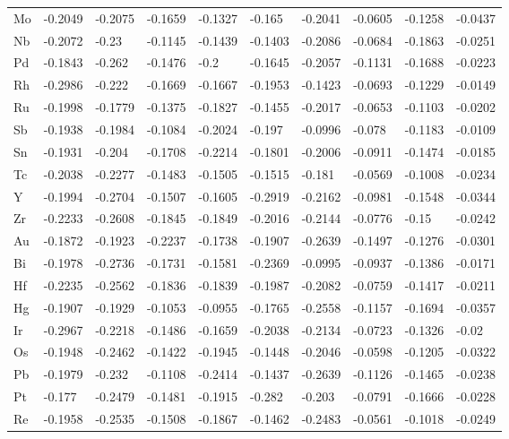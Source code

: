 \begin{table}[h]
{\begin{tabular}{*{10}{l}}
      Mo & -0.2049 & -0.2075 & -0.1659 & -0.1327 & -0.165  & -0.2041 & -0.0605 & -0.1258 & -0.0437 \\
      Nb & -0.2072 & -0.23   & -0.1145 & -0.1439 & -0.1403 & -0.2086 & -0.0684 & -0.1863 & -0.0251 \\
      Pd & -0.1843 & -0.262  & -0.1476 & -0.2    & -0.1645 & -0.2057 & -0.1131 & -0.1688 & -0.0223 \\
      Rh & -0.2986 & -0.222  & -0.1669 & -0.1667 & -0.1953 & -0.1423 & -0.0693 & -0.1229 & -0.0149 \\
      Ru & -0.1998 & -0.1779 & -0.1375 & -0.1827 & -0.1455 & -0.2017 & -0.0653 & -0.1103 & -0.0202 \\
      Sb & -0.1938 & -0.1984 & -0.1084 & -0.2024 & -0.197  & -0.0996 & -0.078  & -0.1183 & -0.0109 \\
      Sn & -0.1931 & -0.204  & -0.1708 & -0.2214 & -0.1801 & -0.2006 & -0.0911 & -0.1474 & -0.0185 \\
      Tc & -0.2038 & -0.2277 & -0.1483 & -0.1505 & -0.1515 & -0.181  & -0.0569 & -0.1008 & -0.0234 \\
      Y  & -0.1994 & -0.2704 & -0.1507 & -0.1605 & -0.2919 & -0.2162 & -0.0981 & -0.1548 & -0.0344 \\
      Zr & -0.2233 & -0.2608 & -0.1845 & -0.1849 & -0.2016 & -0.2144 & -0.0776 & -0.15   & -0.0242 \\
      Au & -0.1872 & -0.1923 & -0.2237 & -0.1738 & -0.1907 & -0.2639 & -0.1497 & -0.1276 & -0.0301 \\
      Bi & -0.1978 & -0.2736 & -0.1731 & -0.1581 & -0.2369 & -0.0995 & -0.0937 & -0.1386 & -0.0171 \\
      Hf & -0.2235 & -0.2562 & -0.1836 & -0.1839 & -0.1987 & -0.2082 & -0.0759 & -0.1417 & -0.0211 \\
      Hg & -0.1907 & -0.1929 & -0.1053 & -0.0955 & -0.1765 & -0.2558 & -0.1157 & -0.1694 & -0.0357 \\
      Ir & -0.2967 & -0.2218 & -0.1486 & -0.1659 & -0.2038 & -0.2134 & -0.0723 & -0.1326 & -0.02   \\
      Os & -0.1948 & -0.2462 & -0.1422 & -0.1945 & -0.1448 & -0.2046 & -0.0598 & -0.1205 & -0.0322 \\
      Pb & -0.1979 & -0.232  & -0.1108 & -0.2414 & -0.1437 & -0.2639 & -0.1126 & -0.1465 & -0.0238 \\
      Pt & -0.177  & -0.2479 & -0.1481 & -0.1915 & -0.282  & -0.203  & -0.0791 & -0.1666 & -0.0228 \\
      Re & -0.1958 & -0.2535 & -0.1508 & -0.1867 & -0.1462 & -0.2483 & -0.0561 & -0.1018 & -0.0249 \\

\end{tabular}}
\end{table}
